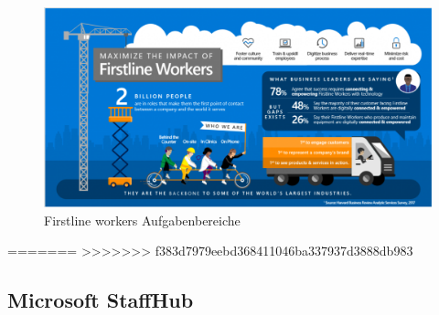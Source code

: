 \begin{figure}[H] 
\centering 
\includegraphics[scale=0.48]{images/frontlineworkers} 
\caption[Frontline Workers]{Firstline workers Aufgabenbereiche\protect} 
\label{dem} 
\end{figure}
=======
%
%
%
>>>>>>> f383d7979eebd368411046ba337937d3888db983


\subsection{Microsoft StaffHub}

